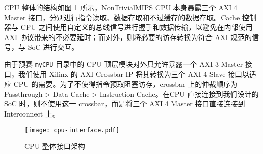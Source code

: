 CPU 整体的结构如图 \ref{fig:cpu-interface} 所示，NonTrivialMIPS CPU 本身暴露三个 AXI 4 Master 接口，分别进行指令读取、数据存取和不过缓存的数据存取。Cache 控制器与 CPU 之间使用自定义的总线信号进行握手和数据传输，以避免在内部使用 AXI 协议带来的不必要延时；而对外，则将必要的访存转换为符合 AXI 规范的信号，与 SoC 进行交互。

由于预赛 \texttt{myCPU} 目录中的 CPU 顶层模块对外只允许暴露一个 AXI 3 Master 接口，我们使用 Xilinx 的 AXI Crossbar IP 将其转换为三个 AXI 4 Slave 接口以适应 CPU 的需要。为了不使得指令预取阻塞访存，crossbar 上的仲裁顺序为 Passthrough > Data Cache > Instruction Cache。在CPU 直接连接到我们设计的 SoC 时，则不使用这一 crossbar，而是将三个 AXI 4 Master 接口直接连接到 Interconnect 上。

\begin{figure}[htbp]
	\centering
	\texttt{[image: cpu-interface.pdf]}
	\caption{CPU 整体接口架构}
	\label{fig:cpu-interface}
\end{figure}

	